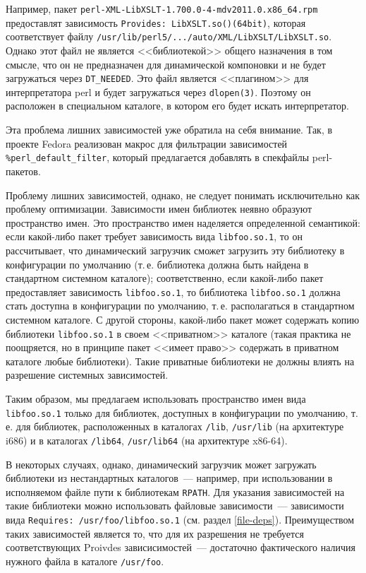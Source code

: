 \documentclass[russian,a4paper,12pt,titlepage]{article}
\begin{document}
Например, пакет \verb|perl-XML-LibXSLT-1.700.0-4-mdv2011.0.x86_64.rpm| предоставлят зависимость \verb|Provides: LibXSLT.so()(64bit)|,
которая соответствует файлу \texttt{/usr/lib/perl5/.../auto/XML/LibXSLT/LibXSLT.so}.  Однако этот файл не является <<библиотекой>>
общего назначения в том смысле, что он не предназначен для динамической компоновки и не будет загружаться через \verb|DT_NEEDED|.
Это файл является <<плагином>> для интерпретатора perl и будет загружаться через \verb|dlopen(3)|.  Поэтому он расположен
в специальном каталоге, в котором его будет искать интерпретатор.

Эта проблема лишних зависимостей уже обратила на себя внимание.  Так, в проекте Fedora реализован макрос для
фильтрации зависимостей \verb|%perl_default_filter|, который предлагается добавлять в спекфайлы perl-пакетов.

Проблему лишних зависимостей, однако, не следует понимать исключительно как проблему оптимизации.
Зависимости имен библиотек неявно образуют пространство имен.  Это пространство имен наделяется
определенной семантикой: если какой-либо пакет требует зависимость вида \verb|libfoo.so.1|,
то он рассчитывает, что динамический загрузчик сможет загрузить эту библиотеку в конфигурации
по умолчанию (т.\,е. библиотека должна быть найдена в стандартном системном каталоге);
соответственно, если какой-либо пакет предоставляет зависимость \verb|libfoo.so.1|,
то библиотека \verb|libfoo.so.1| должна стать доступна в конфигурации по умолчанию, т.\,е.
располагаться в стандартном системном каталоге.  С другой стороны, какой-либо пакет может
содержать копию библиотеки \verb|libfoo.so.1| в своем <<приватном>> каталоге (такая практика
не поощряется, но в принципе пакет <<имеет право>> содержать в приватном каталоге любые библиотеки).
Такие приватные библиотеки не должны влиять на разрешение системных зависимостей.

Таким образом, мы предлагаем использовать пространство имен вида \verb|libfoo.so.1| только для
библиотек, доступных в конфигурации по умолчанию, т.\,е. для библиотек, расположенных в каталогах
\verb|/lib|, \verb|/usr/lib| (на архитектуре i686) и в каталогах \verb|/lib64|, \verb|/usr/lib64|
(на архитектуре x86-64).

В некоторых случаях, однако, динамический загрузчик может загружать библиотеки из нестандартных
каталогов~--- например, при использовании в исполняемом файле пути к библиотекам \verb|RPATH|.
Для указания зависимостей на такие библиотеки можно использовать файловые зависимости~---
зависимости вида \texttt{Requires: /usr/foo/libfoo.so.1} (см. раздел \ref{file-deps}).
Преимуществом таких зависимостей является то, что для их разрешения не требуется соответствующих
Proivdes зависисимостей~--- достаточно фактического наличия нужного файла в каталоге \verb|/usr/foo|.
\end{document}
